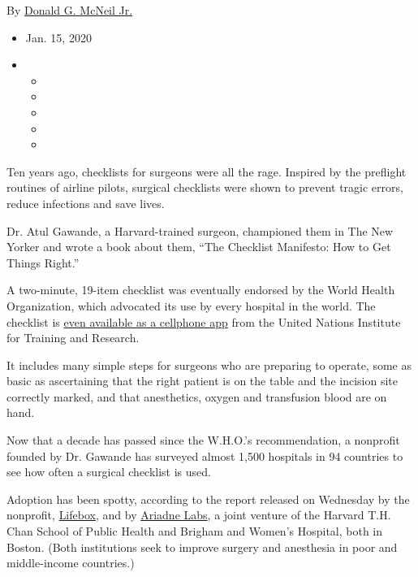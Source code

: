 By
\href{https://www.nytimes3xbfgragh.onion/by/donald-g-mcneil-jr}{Donald
G. McNeil Jr.}

\begin{itemize}
\item
  Jan. 15, 2020
\item
  \begin{itemize}
  \item
  \item
  \item
  \item
  \item
  \end{itemize}
\end{itemize}

Ten years ago, checklists for surgeons were all the rage. Inspired by
the preflight routines of airline pilots, surgical checklists were shown
to prevent tragic errors, reduce infections and save lives.

Dr. Atul Gawande, a Harvard-trained surgeon, championed them in The New
Yorker and wrote a book about them, ``The Checklist Manifesto: How to
Get Things Right.''

A two-minute, 19-item checklist was eventually endorsed by the World
Health Organization, which advocated its use by every hospital in the
world. The checklist is
\href{https://unitar.org/about/news-stories/news/unitar-and-partners-launch-new-mobile-application-who-surgical-safety-checklist}{even
available as a cellphone app} from the United Nations Institute for
Training and Research.

It includes many simple steps for surgeons who are preparing to operate,
some as basic as ascertaining that the right patient is on the table and
the incision site correctly marked, and that anesthetics, oxygen and
transfusion blood are on hand.

Now that a decade has passed since the W.H.O.'s recommendation, a
nonprofit founded by Dr. Gawande has surveyed almost 1,500 hospitals in
94 countries to see how often a surgical checklist is used.

Adoption has been spotty, according to the report released on Wednesday
by the nonprofit, \href{https://www.lifebox.org/}{Lifebox}, and by
\href{https://www.ariadnelabs.org/areas-of-work/safe-surgery-checklist/}{Ariadne
Labs}, a joint venture of the Harvard T.H. Chan School of Public Health
and Brigham and Women's Hospital, both in Boston. (Both institutions
seek to improve surgery and anesthesia in poor and middle-income
countries.)

